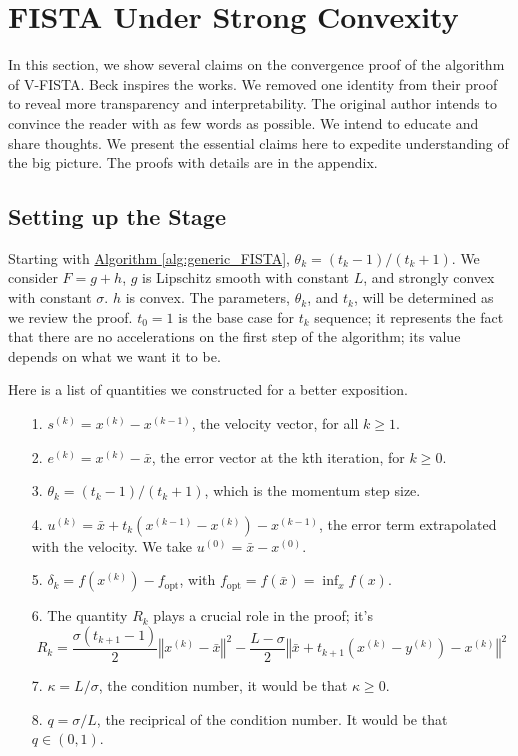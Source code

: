\documentclass[]{article}
\theoremstyle{definition}
\numberwithin{equation}{subsection}
\begin{document}
\section{FISTA Under Strong Convexity}\label{sec:fista_strong_convexity}
    In this section, we show several claims on the convergence proof of the algorithm of V-FISTA. 
    Beck \cite[10.7.7]{beck_first-order_nodate} inspires the works. 
    We removed one identity from their proof to reveal more transparency and interpretability. 
    The original author intends to convince the reader with as few words as possible. 
    We intend to educate and share thoughts. 
    We present the essential claims here to expedite understanding of the big picture. 
    The proofs with details are in the appendix. 
    \subsection{Setting up the Stage}
        Starting with \hyperref[alg:generic_FISTA]{Algorithm \ref*{alg:generic_FISTA}}, $\theta_k = (t_k - 1)/(t_k + 1)$. 
        We consider $F = g + h$, $g$ is Lipschitz smooth with constant $L$, and strongly convex with constant $\sigma$. 
        $h$ is convex. 
        The parameters, $\theta_k$, and $t_k$, will be determined as we review the proof. 
        $t_{0} = 1$ is the base case for $t_k$ sequence; it represents the fact that there are no accelerations on the first step of the algorithm; its value depends on what we want it to be. 
        \par
        Here is a list of quantities we constructed for a better exposition. 
        \begin{itemize}
            \item [1.] $s^{(k)} = x^{(k)} - x^{(k - 1)}$, the velocity vector,
            for all $k\ge 1$. 
            \item [2.] $e^{(k)} = x^{(k)} - \bar x$, the error vector at the kth iteration, for $k \ge 0$. 
            \item [3.] $\theta_k = (t_k -1)/(t_k + 1)$, which is the momentum step size. 
            \item [4.] $u^{(k)} = \bar x + t_{k}(x^{(k - 1)} - x^{(k)}) - x^{(k - 1)}$, the error term extrapolated with the velocity. We take $u^{(0)} = \bar x - x^{(0)}$. 
            \item [5.] $\delta_k = f(x^{(k)}) - f_{\text{opt}}$, with $f_{\text{opt}} = f(\bar x) = \inf_x f(x)$. 
            \item [6.] The quantity $R_k$ plays a crucial role in the proof; it's
            $$
                R_k = 
                \frac{\sigma(t_{k + 1} - 1)}{2}
                \left\Vert
                    x^{(k)} - \bar x
                \right\Vert^2 
                - 
                \frac{L - \sigma}{2}
                \left\Vert
                    \bar x + t_{k + 1}\left( x^{(k)} - y^{(k)}\right) - x^{(k)}
                \right\Vert^2
            $$
            \item [7.] $\kappa = L/\sigma$, the condition number, it would be that $\kappa \ge 0$. 
            \item [8.] $q = \sigma/L$, the reciprical of the condition number. It would be that $q \in (0, 1)$. 
        \end{itemize}
\end{document}

